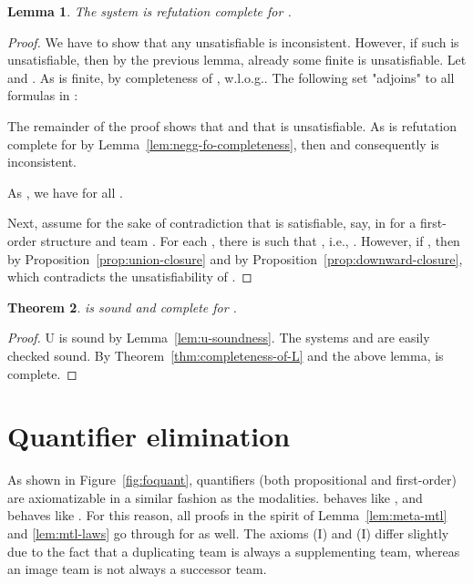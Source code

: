 \documentclass[a4paper,english,fleqn,11pt,final]{scrartcl}
\makeatletter
\newcommand{\ie}{i.e.\@\xspace}
\newcommand{\wloss}{w.l.o.g.\@\xspace}
\newcommand{\Deriv}[1]{{\normalfont\textsf{#1}}}
\theoremstyle{plain}
\newtheorem{theorem}{Theorem}[section]
\newtheorem{lemma}[theorem]{Lemma}
\theoremstyle{definition}
\makeatother
\begin{document}
\begin{lemma}
	The system  is refutation complete for .
\end{lemma}
\begin{proof}
We have to show that any unsatisfiable  is inconsistent.
However, if such  is unsatisfiable, then by the previous lemma, already some finite  is unsatisfiable.
Let  and .
As  is finite, by completeness of , \wloss .
The following set  "adjoins"  to all formulas in :


The remainder of the proof shows that  and that  is unsatisfiable.
As  is refutation complete for  by Lemma~\ref{lem:negg-fo-completeness}, then  and consequently  is inconsistent.

As , we have  for all .

 Next, assume for the sake of contradiction that  is satisfiable, say, in  for a first-order structure  and team .
For each , there is  such that , \ie, .
However, if , then  by Proposition~\ref{prop:union-closure} and  by Proposition~\ref{prop:downward-closure}, which contradicts the unsatisfiability of .
\end{proof}

\begin{theorem}\label{thm:completeness-b-fo}
 is sound and complete for .
\end{theorem}
\begin{proof}
\Deriv{U} is sound by Lemma~\ref{lem:u-soundness}.
The systems  and  are easily checked sound.
By Theorem~\ref{thm:completeness-of-L} and the above lemma,  is complete.
\end{proof}
 

\section{Quantifier elimination}

\label{sec:qbf}

As shown in Figure~\ref{fig:foquant}, quantifiers (both propositional and first-order) are axiomatizable in a similar fashion as the modalities.
 behaves like , and  behaves like .
For this reason, all proofs in the spirit of Lemma~\ref{lem:meta-mtl} and \ref{lem:mtl-laws} go through for  as well.
The axioms \Deriv{(I)} and \Deriv{(I)} differ slightly due to the fact that a duplicating team is always a supplementing team, whereas an image team is not always a successor team.
\end{document}
